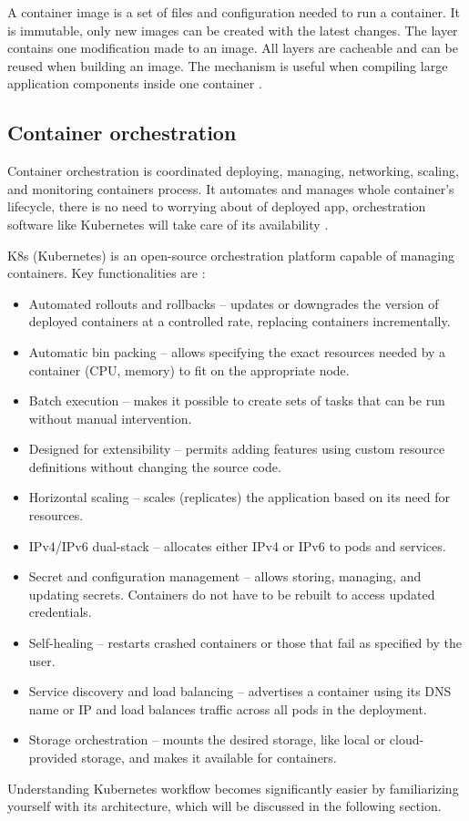 A container image is a set of files and configuration needed to run a container. It is immutable, only new images can be created with the latest changes. The layer contains one modification made to an image. All layers are cacheable and can be reused when building an image. The mechanism is useful when compiling large application components inside one container \cite{DockerDocs}. 


\subsection{Container orchestration}
\label{sec:ContainerOrchestration}

Container orchestration is coordinated deploying, managing, networking, scaling, and monitoring containers process. It automates and manages whole container's lifecycle, there is no need to worrying about of deployed app, orchestration software like Kubernetes will take care of its availability \cite{RedhatContainerization}.

K8s (Kubernetes) is an open-source orchestration platform capable of managing containers. Key functionalities are \cite{KubernetesDocs}:

\begin{itemize}
    \item Automated rollouts and rollbacks -- updates or downgrades the version of deployed containers at a controlled rate, replacing containers incrementally.
    \item Automatic bin packing -- allows specifying the exact resources needed by a container (CPU, memory) to fit on the appropriate node.
    \item Batch execution -- makes it possible to create sets of tasks that can be run without manual intervention.
    \item Designed for extensibility -- permits adding features using custom resource definitions without changing the source code.
    \item Horizontal scaling -- scales (replicates) the application based on its need for resources.
    \item IPv4/IPv6 dual-stack -- allocates either IPv4 or IPv6 to pods and services.
    \item Secret and configuration management -- allows storing, managing, and updating secrets. Containers do not have to be rebuilt to access updated credentials.
    \item Self-healing -- restarts crashed containers or those that fail as specified by the user.
    \item Service discovery and load balancing -- advertises a container using its DNS name or IP and load balances traffic across all pods in the deployment.
    \item Storage orchestration -- mounts the desired storage, like local or cloud-provided storage, and makes it available for containers.
\end{itemize}
Understanding Kubernetes workflow becomes significantly easier by familiarizing yourself with its architecture, which will be discussed in the following section.


